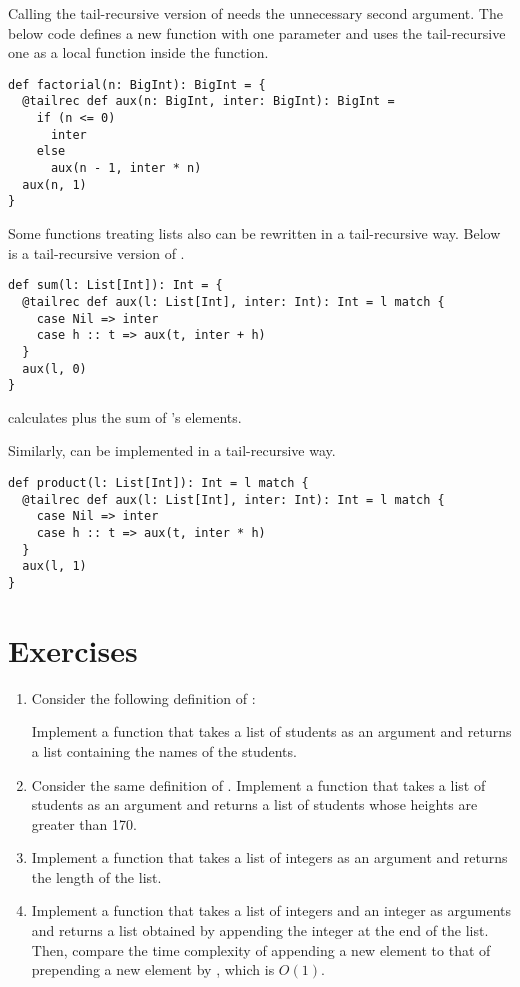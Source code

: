 Calling the tail-recursive version of  needs the unnecessary
second argument. The below code defines a new  function with one
parameter and uses the tail-recursive one as a local function inside the
function.

\begin{verbatim}
def factorial(n: BigInt): BigInt = {
  @tailrec def aux(n: BigInt, inter: BigInt): BigInt =
    if (n <= 0)
      inter
    else
      aux(n - 1, inter * n)
  aux(n, 1)
}
\end{verbatim}

Some functions treating lists also can be rewritten in a tail-recursive way.
Below is a tail-recursive version of .

\begin{verbatim}
def sum(l: List[Int]): Int = {
  @tailrec def aux(l: List[Int], inter: Int): Int = l match {
    case Nil => inter
    case h :: t => aux(t, inter + h)
  }
  aux(l, 0)
}
\end{verbatim}

 calculates  plus the sum of 's elements.

Similarly,  can be implemented in a tail-recursive way.

\begin{verbatim}
def product(l: List[Int]): Int = l match {
  @tailrec def aux(l: List[Int], inter: Int): Int = l match {
    case Nil => inter
    case h :: t => aux(t, inter * h)
  }
  aux(l, 1)
}
\end{verbatim}

\section{Exercises}

\begin{enumerate}
  \item Consider the following definition of :


    Implement a function that takes a list of students as an argument
    and returns a list containing the names of the students.

  \item Consider the same definition of .
    Implement a function that takes a list of students as an argument
    and returns a list of students whose heights are greater than 170.

  \item
    Implement a function that takes a list of integers as an argument
    and returns the length of the list.

  \item
    Implement a function that takes a list of integers and an integer as arguments
    and returns a list obtained by appending the integer at the end of the list.
    Then, compare the time complexity of appending a new element to that of
    prepending a new element by \code{::}, which is $O(1)$.
\end{enumerate}

